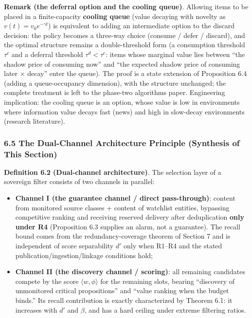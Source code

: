 \documentclass[
  11pt]{article}
\providecommand{\tightlist}{%
  \setlength{\itemsep}{0pt}\setlength{\parskip}{0pt}}
\begin{document}
\textbf{Remark (the deferral option and the cooling queue)}. Allowing
items to be placed in a finite-capacity \textbf{cooling queue} (value
decaying with novelty as \(v(t) = v_0 e^{-\gamma t}\)) is equivalent to
adding an intermediate option to the discard decision: the policy
becomes a three-way choice (consume / defer / discard), and the optimal
structure remains a double-threshold form (a consumption threshold
\(\tau^{c}\) and a deferral threshold \(\tau^{d} < \tau^{c}\): items
whose marginal value lies between ``the shadow price of consuming now''
and ``the expected shadow price of consuming later × decay'' enter the
queue). The proof is a state extension of Proposition 6.4 (adding a
queue-occupancy dimension), with the structure unchanged; the complete
treatment is left to the phase-two algorithms paper. Engineering
implication: the cooling queue is an option, whose value is low in
environments where information value decays fast (news) and high in
slow-decay environments (research literature).

\subsubsection{6.5 The Dual-Channel Architecture Principle (Synthesis of
This
Section)}\label{the-dual-channel-architecture-principle-synthesis-of-this-section}

\textbf{Definition 6.2 (Dual-channel architecture)}. The selection layer
of a sovereign filter consists of two channels in parallel:

\begin{itemize}
\tightlist
\item
  \textbf{Channel I (the guarantee channel / direct pass-through)}:
  content from monitored source classes + content of watchlist entities,
  bypassing competitive ranking and receiving reserved delivery after
  deduplication \textbf{only under R4} (Proposition 6.3 supplies an
  alarm, not a guarantee). The recall bound comes from the
  redundancy-coverage theorem of Section 7 and is independent of score
  separability \(d'\) only when R1--R4 and the stated
  publication/ingestion/linkage conditions hold;
\item
  \textbf{Channel II (the discovery channel / scoring)}: all remaining
  candidates compete by the score \(\langle w, \phi \rangle\) for the
  remaining slots, bearing ``discovery of unmonitored critical
  propositions'' and ``value ranking when the budget binds.'' Its recall
  contribution is exactly characterized by Theorem 6.1: it increases
  with \(d'\) and \(\beta\), and has a hard ceiling under extreme
  filtering ratios.
\end{itemize}
\end{document}
